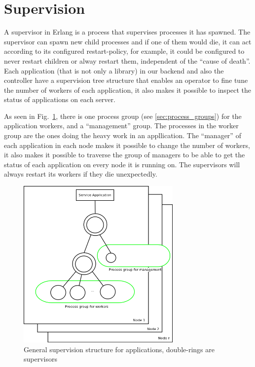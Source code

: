 \documentclass[11pt,a4paper]{report}
\begin{document}
\newpage
\section{Supervision}
A supervisor in Erlang is a process that supervises processes it has spawned.
The supervisor can spawn new child processes and if one of them would die, it
can act according to its configured restart-policy, for example, it could be
configured to never restart children or alway restart them, independent of the
``cause of death''.\\

Each application (that is not only a library) in our backend and also the
controller have a supervision tree structure that enables an operator to fine
tune the number of workers of each application, it also makes it possible
to inspect the status of applications on each server.

As seen in Fig.~\ref{fig:service_app}, there is one process group
(see \ref{sec:process_groups}) for the application workers, and a ``management''
group. The processes in the worker group are the ones doing the heavy work in an
appllication. The ``manager'' of each application in each node makes it
possible to change the number of workers, it also makes it possible to traverse
the group of managers to be able to get the status of each application on every
node it is running on. The supervisors will always restart its workers if they
die unexpectedly.
\begin{figure}[h]
 \centering
 \includegraphics[width=8cm]{./graphics/Service_Application.png}
 \caption{General supervision structure for applications, double-rings are supervisors}
 \label{fig:service_app}
\end{figure}
\end{document}
